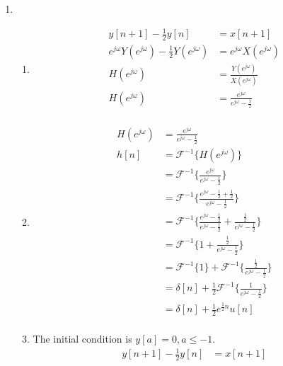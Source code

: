 \documentclass[10pt,a4paper, margin=1in]{article}
\begin{document}
\begin{enumerate}
\begin{enumerate}
    \end{enumerate}

\item %
	\begin{enumerate}
    \item %
    \begin{align*}
        y[n + 1] - \frac{1}{2}y[n] &= x[n + 1] \\ 
        e^{j\omega}Y(e^{j\omega}) - \frac{1}{2}Y(e^{j\omega}) &= e^{j\omega}X(e^{j\omega}) \\
        H(e^{j\omega}) &= \frac{Y(e^{j\omega})}{X(e^{j\omega})} \\
        H(e^{j\omega}) &= \frac{e^{j\omega}}{e^{j\omega} - \frac{1}{2}} \\
    \end{align*}
    \item %
    \begin{align*}
        H(e^{j\omega}) &= \frac{e^{j\omega}}{e^{j\omega} - \frac{1}{2}} \\
        h[n] &= \mathcal{F}^{-1}\{H(e^{j\omega})\} \\
        &= \mathcal{F}^{-1}\{\frac{e^{j\omega}}{e^{j\omega} - \frac{1}{2}}\} \\
        &= \mathcal{F}^{-1}\{\frac{e^{j\omega} - \frac{1}{2} + \frac{1}{2}}{e^{j\omega} - \frac{1}{2}}\} \\
        &= \mathcal{F}^{-1}\{\frac{e^{j\omega} - \frac{1}{2}}{e^{j\omega} - \frac{1}{2}} + \frac{\frac{1}{2}}{e^{j\omega} - \frac{1}{2}}\} \\
        &= \mathcal{F}^{-1}\{1 + \frac{\frac{1}{2}}{e^{j\omega} - \frac{1}{2}}\} \\
        &= \mathcal{F}^{-1}\{1\} + \mathcal{F}^{-1}\{\frac{\frac{1}{2}}{e^{j\omega} - \frac{1}{2}}\} \\
        &= \delta[n] + \frac{1}{2}\mathcal{F}^{-1}\{\frac{1}{e^{j\omega} - \frac{1}{2}}\} \\
        &= \delta[n] + \frac{1}{2}e^{\frac{1}{2}n}u[n] \\
    \end{align*}
	\item %
    The initial condition is $y[a] = 0, a \leq -1$.
    \begin{align*}
        y[n + 1] - \frac{1}{2}y[n] &= x[n + 1] \\

\end{align*}
\end{enumerate}
\end{enumerate}
\end{document}
